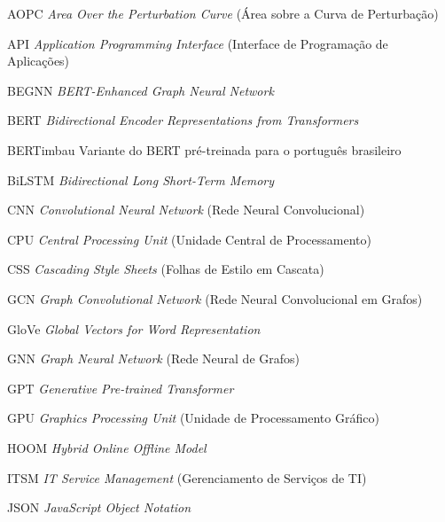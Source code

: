 \documentclass[
    12pt,                %
    openright,           %
    oneside,             %
    a4paper,             %
    english,             %
    brazil               %
]{abntex2}
\begin{document}
 \listoffigures*
 \cleardoublepage

 \listoftables*
 \cleardoublepage

\begin{siglas}
  \item[AOPC] \textit{Area Over the Perturbation Curve} (Área sobre a Curva de Perturbação)
  \item[API] \textit{Application Programming Interface} (Interface de Programação de Aplicações)
  \item[BEGNN] \textit{BERT-Enhanced Graph Neural Network}
  \item[BERT] \textit{Bidirectional Encoder Representations from Transformers}
  \item[BERTimbau] Variante do BERT pré-treinada para o português brasileiro
  \item[BiLSTM] \textit{Bidirectional Long Short-Term Memory}
  \item[CNN] \textit{Convolutional Neural Network} (Rede Neural Convolucional)
  \item[CPU] \textit{Central Processing Unit} (Unidade Central de Processamento)
  \item[CSS] \textit{Cascading Style Sheets} (Folhas de Estilo em Cascata)
  \item[GCN] \textit{Graph Convolutional Network} (Rede Neural Convolucional em Grafos)
  \item[GloVe] \textit{Global Vectors for Word Representation}
  \item[GNN] \textit{Graph Neural Network} (Rede Neural de Grafos)
  \item[GPT] \textit{Generative Pre-trained Transformer}
  \item[GPU] \textit{Graphics Processing Unit} (Unidade de Processamento Gráfico)
  \item[HOOM] \textit{Hybrid Online Offline Model}
  \item[ITSM] \textit{IT Service Management} (Gerenciamento de Serviços de TI)
  \item[JSON] \textit{JavaScript Object Notation}

\end{siglas}
\end{document}
